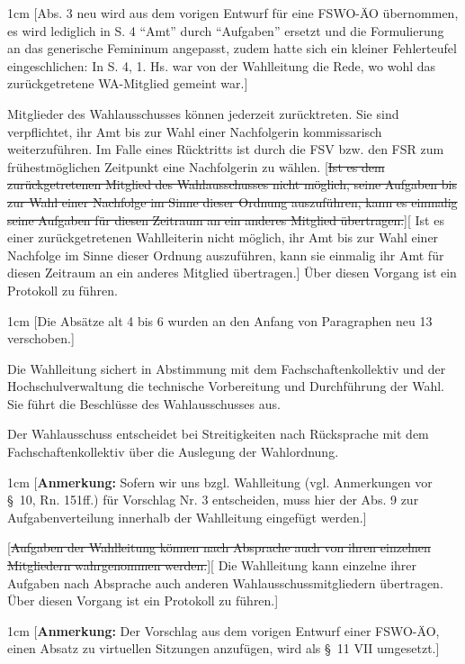 \documentclass[%
draft,%
multilinesections%
]{fswo}
\newcommand\oldT[1]  {{\color{Gray}[\st{#1}]}}
\newcommand\newT[1]  {{\color{Green}[#1]}}
\newcommand\bemFr[1] {{\color{Red}[#1]}}
\newcommand\bemFe[1] {{\color{Cyan}[#1]}}
\newcommand\remark[1]{\begin{addmargin}{1cm}#1\end{addmargin}}
\newcommand\oldT[1]{}%
\newcommand\newT[1]{#1}
\newcommand\bemFr[1]{}%
\newcommand\bemFe[1]{}%
\newcommand\remark[1]{}
\newcommand\change[2]{\oldT{#1}\newT{#2}}
\begin{document}
\begin{contract}
\remark{%
\bemFr{Abs. 3 neu wird aus dem vorigen Entwurf für eine FSWO-ÄO übernommen, es wird lediglich in S. 4 \enquote{Amt} durch \enquote{Aufgaben} ersetzt und die Formulierung an das generische Femininum angepasst,
zudem hatte sich ein kleiner Fehlerteufel eingeschlichen:
In S. 4, 1. Hs. war von der Wahlleitung die Rede, wo wohl das zurückgetretene WA-Mitglied gemeint war.}}

Mitglieder des Wahlausschusses können jederzeit zurücktreten.
Sie sind verpflichtet, ihr Amt bis zur Wahl einer Nachfolgerin kommissarisch weiterzuführen.
Im Falle eines Rücktritts ist durch die FSV bzw. den FSR zum frühestmöglichen Zeitpunkt eine Nachfolgerin zu wählen.
\change{Ist es dem zurückgetretenen Mitglied des Wahlausschusses nicht möglich, seine Aufgaben bis zur Wahl einer Nachfolge im Sinne dieser Ordnung auszuführen, kann es einmalig seine Aufgaben für diesen Zeitraum an ein anderes Mitglied übertragen.}{%
Ist es einer zurückgetretenen Wahlleiterin nicht möglich, ihr Amt bis zur Wahl einer
Nachfolge im Sinne dieser Ordnung auszuführen, kann sie einmalig ihr Amt für diesen
Zeitraum an ein anderes Mitglied übertragen.}
Über diesen Vorgang ist ein Protokoll zu führen.

\remark{%
\bemFe{Die Absätze alt 4 bis 6 wurden an den Anfang von Paragraphen neu 13 verschoben.}}


Die Wahlleitung sichert in Abstimmung mit dem Fachschaftenkollektiv und der Hochschulverwaltung die technische Vorbereitung und Durchführung der Wahl.
Sie führt die Beschlüsse des Wahlausschusses aus.

Der Wahlausschuss entscheidet bei Streitigkeiten nach Rücksprache mit dem Fachschaftenkollektiv über die Auslegung der Wahlordnung.
%
\remark{%
\bemFr{\textbf{Anmerkung:} Sofern wir uns bzgl. Wahlleitung (vgl. Anmerkungen vor \S~10, Rn. 151ff.) für Vorschlag Nr. 3 entscheiden, muss hier der Abs. 9 zur Aufgabenverteilung innerhalb der Wahlleitung eingefügt werden.}}

\change{Aufgaben der Wahlleitung können nach Absprache auch von ihren einzelnen Mitgliedern wahrgenommen werden.}{%
Die Wahlleitung kann einzelne ihrer Aufgaben nach Absprache auch anderen Wahlausschussmitgliedern übertragen. Über diesen Vorgang ist ein Protokoll zu führen.}
%
\remark{%
\bemFr{\textbf{Anmerkung:} Der Vorschlag aus dem vorigen Entwurf einer FSWO-ÄO, einen Absatz zu virtuellen Sitzungen anzufügen, wird als \S~11 VII umgesetzt.}}
\end{contract}
\end{document}
